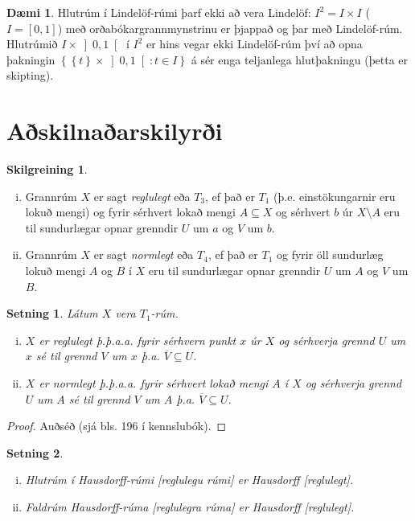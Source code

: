 \documentclass[a4paper,icelandic]{book}
\theoremstyle{definition}
\newtheorem{skilgr}{Skilgreining}[section]
\newtheorem{daemi}{Dæmi}[section]
\theoremstyle{plain}
\newtheorem{setn}{Setning}[section]
\theoremstyle{remark}
\begin{document}
\begin{daemi}
  Hlutrúm í Lindelöf-rúmi þarf ekki að vera Lindelöf: $I^2 = I\times
  I$ ($I = [0,1]$) með orðabókargrannmynstrinu er þjappað og þar
  með Lindelöf-rúm. Hlutrúmið $I\times\left]0,1\right[$ í $I^2$ er hins
  vegar ekki Lindelöf-rúm því að opna þakningin $\left\{ \left\{ t
  \right\}\times\left]0,1\right[ :t\in I \right\}$ á sér enga teljanlega
  hlutþakningu (þetta er skipting).
\end{daemi}


\section{Aðskilnaðarskilyrði}

\begin{skilgr}
  \begin{enumerate}[(i)]
    \item Grannrúm $X$ er sagt \emph{reglulegt} eða $T_3$, ef það er $T_1$ (þ.e.
      einstökungarnir eru lokuð mengi) og fyrir sérhvert lokað mengi
      $A\subseteq X$ og sérhvert $b$ úr $X\setminus A$ eru til
      sundurlægar opnar grenndir $U$ um $a$ og $V$ um $b$. 
    \item Grannrúm $X$ er sagt \emph{normlegt}
      eða $T_4$, ef það er $T_1$ og fyrir öll
      sundurlæg lokuð mengi $A$ og $B$ í $X$ eru til sundurlægar opnar
      grenndir $U$ um $A$ og $V$ um $B$.
  \end{enumerate}
\end{skilgr}
\begin{setn}
  Látum $X$ vera $T_1$-rúm.
  \begin{enumerate}[(i)]
    \item $X$ er reglulegt \emph{þ.þ.a.a.} fyrir sérhvern punkt $x$ úr
      $X$ og sérhverja grennd $U$ um $x$ sé til grennd $V$ um $x$ þ.a.
      $\overline V\subseteq U$.
    \item $X$ er normlegt \emph{þ.þ.a.a.} fyrir sérhvert lokað mengi $A$
      í $X$ og sérhverja grennd $U$ um $A$ sé til grennd $V$ um $A$ þ.a.
      $\overline V\subseteq U$.
  \end{enumerate}
\end{setn}
\begin{proof}
  Auðséð (sjá bls. 196 í kennslubók).
\end{proof}
\begin{setn}
  \begin{enumerate}[(i)]
    \item Hlutrúm í Hausdorff-rúmi [reglulegu rúmi] er Hausdorff
      [reglulegt].
    \item Faldrúm Hausdorff-rúma [reglulegra rúma] er Hausdorff
      [reglulegt].
  \end{enumerate}
\end{setn}
\end{document}
